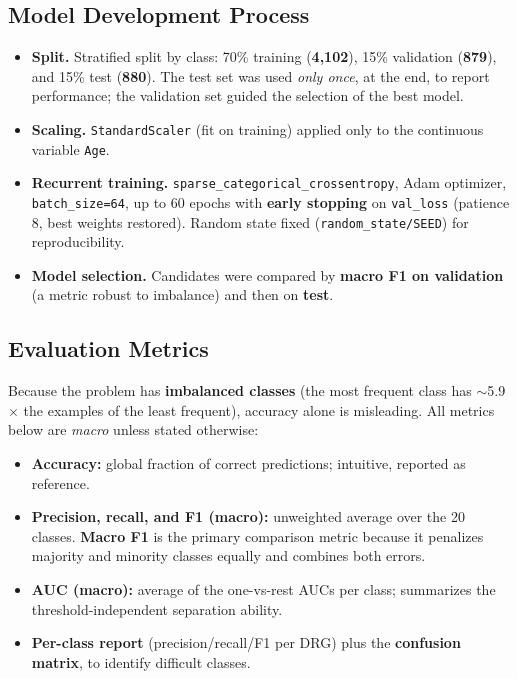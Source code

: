 \documentclass{ieeeaccess}
\begin{document}
\subsection{Model Development Process}
\label{sec:dev}
\begin{itemize}
  \item \textbf{Split.} Stratified split by class: 70\% training (\textbf{4,102}), 15\% validation (\textbf{879}), and 15\% test (\textbf{880}). The test set was used \emph{only once}, at the end, to report performance; the validation set guided the selection of the best model.
  \item \textbf{Scaling.} \texttt{StandardScaler} (fit on training) applied only to the continuous variable \texttt{Age}.
  \item \textbf{Recurrent training.} \texttt{sparse\_categorical\_\allowbreak crossentropy}, Adam optimizer, \texttt{batch\_size=64}, up to 60 epochs with \textbf{early stopping} on \texttt{val\_loss} (patience 8, best weights restored). Random state fixed (\texttt{random\_state/SEED}) for reproducibility.
  \item \textbf{Model selection.} Candidates were compared by \textbf{macro F1 on validation} (a metric robust to imbalance) and then on \textbf{test}.
\end{itemize}

\subsection{Evaluation Metrics}
\label{sec:metrics}
Because the problem has \textbf{imbalanced classes} (the most frequent class has $\sim$5.9$\times$ the examples of the least frequent), accuracy alone is misleading. All metrics below are \emph{macro} unless stated otherwise:
\begin{itemize}
  \item \textbf{Accuracy:} global fraction of correct predictions; intuitive, reported as reference.
  \item \textbf{Precision, recall, and F1 (macro):} unweighted average over the 20 classes. \textbf{Macro F1} is the primary comparison metric because it penalizes majority and minority classes equally and combines both errors.
  \item \textbf{AUC (macro):} average of the one-vs-rest AUCs per class; summarizes the threshold-independent separation ability.
  \item \textbf{Per-class report} (precision/recall/F1 per DRG) plus the \textbf{confusion matrix}, to identify difficult classes.
\end{itemize}
\end{document}
